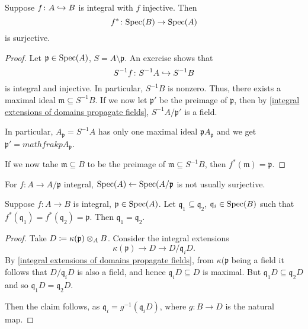\begin{prop}
  Suppose $f \colon A \hookrightarrow B$ is integral with $f$ injective. Then
  \[ f^* \colon \text{Spec}(B) \to \text{Spec}(A)\]
  is surjective.
\end{prop}
\begin{proof}
  Let $\mathfrak p \in \text{Spec}(A)$, $S = A \setminus \mathfrak p$. An exercise shows that
  \[ S^{-1} f \colon S^{-1} A \hookrightarrow S^{-1}B\]
  is integral and injective.
  In particular, $S^{-1}B$ is nonzero.
  Thus, there exists a maximal ideal $\mathfrak m \subseteq S^{-1}B$. If we now let $\mathfrak p'$ be the preimage of $\mathfrak p$, then by \cref{integral extensions of domains propagate fields}, $S^{-1}A /{\mathfrak p'}$ is a field.

  In particular, $A_{\mathfrak p} = S^{-1}A$ has only one maximal ideal $\mathfrak p A_{\mathfrak p}$ and we get $\mathfrak p' = mathfrak p A_{\mathfrak p}$.

  If we now tahe $\mathfrak m \subseteq B$ to be the preimage of $\mathfrak m \subseteq S^{-1}B$, then $f^*(\mathfrak m) = \mathfrak p$.
\end{proof}

\begin{note}
  For $f \colon A \to A/{\mathfrak p}$ integral, $\text{Spec}(A) \leftarrow \text{Spec}(A/{\mathfrak p}$ is not usually surjective.
\end{note}


\begin{prop}[incomparability]
  Suppose $f \colon A \to B$ is integral, $\mathfrak p \in \text{Spec}(A)$. Let $\mathfrak q_1 \subseteq \mathfrak q_2$, $\mathfrak q_i \in \text{Spec}(B)$ such that $f^*(\mathfrak q_1) = f^*(\mathfrak q_2) = \mathfrak p$. Then $\mathfrak q_1 = \mathfrak q_2$.
\end{prop}
\begin{proof}
  Take $D \coloneqq \kappa(\mathfrak p) \otimes_A B$. Consider the integral extensions
  \[ \kappa(\mathfrak p) \to D \to D/{\mathfrak q_i D}.\]
  By \cref{integral extensions of domains propagate fields}, from $\kappa(\mathfrak p$ being a field it follows that $D/{\mathfrak q_i D}$ is also a field, and hence $\mathfrak q_i D \subseteq D$ is maximal. But $\mathfrak q_1 D \subseteq \mathfrak q_2 D$ and so $\mathfrak q_1 D = \mathfrak q_2 D$.

  Then the claim follows, as $\mathfrak q_i = g^{-1}(\mathfrak q_i D)$, where $g \colon B \to D$ is the natural map.
\end{proof}


